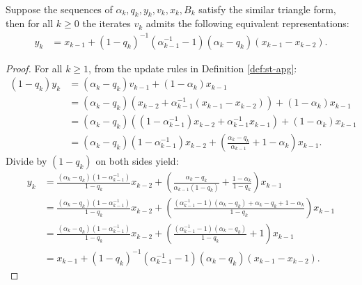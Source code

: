 \documentclass[12pt]{article}
\begin{document}
    \begin{lemma}\;\label{lemma:st-iterates-alt-form-part2}\\
        Suppose the sequences of $\alpha_k, q_k, y_k, v_k, x_k, B_k$ satisfy the similar triangle form, then for all $k \ge 0$ the iterates $v_k$ admits the following equivalent representations: 
        \begin{align*}
            y_k &= 
            x_{k -1} + (1 - q_k)^{-1}(\alpha_{k - 1}^{-1} - 1)(\alpha_k - q_k)(x_{k - 1} - x_{k - 2}). 
        \end{align*}
    \end{lemma}
    \begin{proof}
        For all $k\ge 1$, from the update rules in Definition \ref{def:st-apg}: 
        \begin{align*}
            (1 - q_k)y_k &= 
            (\alpha_k - q_k) v_{k - 1} 
            + (1 - \alpha_k)x_{k - 1}
            \\
            &= 
            (\alpha_k - q_k)\left(
                x_{k - 2} + \alpha_{k - 1}^{-1}(x_{k - 1} - x_{k - 2})
            \right) 
            + (1 - \alpha_k)x_{k - 1}
            \\
            &= 
            (\alpha_k - q_k)((1 - \alpha_{k - 1}^{-1})x_{k -2} + \alpha_{k - 1}^{-1}x_{k - 1}) 
            + (1 - \alpha_k)x_{k - 1}
            \\
            &= (\alpha_k - q_k)(1 - \alpha_{k - 1}^{-1})x_{k - 2}
            + \left(
                \frac{\alpha_k - q_k}{\alpha_{k - 1}} + 1 - \alpha_k
            \right)x_{k - 1}. 
        \end{align*}
        Divide by $(1 - q_k)$ on both sides yield: 
        \begin{align*}
            y_k &= 
            \frac{(\alpha_k - q_k)(1 - \alpha_{k - 1}^{-1})}{1 - q_k}x_{k - 2} 
            + \left(
                \frac{\alpha_k - q_k}{\alpha_{k - 1}(1 - q_k)} + \frac{1 - \alpha_k}{1 - q_k}
            \right)x_{k - 1}
            \\
            &= 
            \frac{(\alpha_k - q_k)(1 - \alpha_{k - 1}^{-1})}{1 - q_k}x_{k - 2} 
            + \left(
                \frac{
                    (\alpha_{k - 1}^{-1} -1)(\alpha_k - q_k)
                    + \alpha_k - q_k + 1 - \alpha_k
                }{1 - q_k}
            \right)x_{k - 1}
            \\
            &= \frac{(\alpha_k - q_k)(1 - \alpha_{k - 1}^{-1})}{1 - q_k}x_{k - 2} 
            + \left(
                \frac{
                    (\alpha_{k - 1}^{-1} -1)(\alpha_k - q_k)
                }{1 - q_k} + 1
            \right)x_{k - 1}
            \\
            &= x_{k -1} + (1 - q_k)^{-1}\left(\alpha_{k - 1}^{-1} - 1\right)(\alpha_k - q_k)(x_{k - 1} - x_{k - 2}). 
        \end{align*}
    \end{proof}
    
\end{document}
